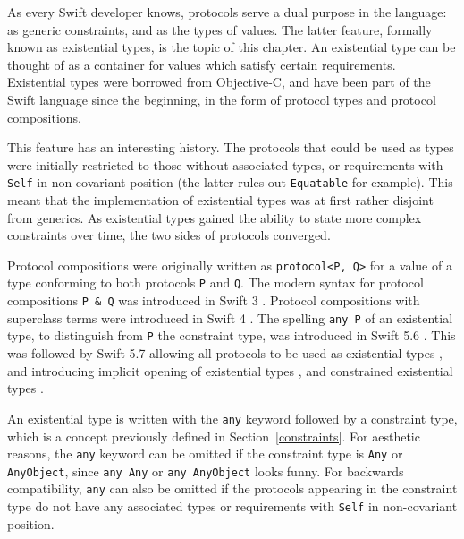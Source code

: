 \documentclass[a4paper,headsepline,bibliography=totoc,toc=flat,fleqn,twoside=semi]{scrbook}
\theoremstyle{definition}
\theoremstyle{definition}
\theoremstyle{definition}
\newcommand{\ifWIP}{\iffalse}
\begin{document}
\ifWIP

As every Swift developer knows, protocols serve a dual purpose in the language: as generic constraints, and as the types of values. The latter feature, formally known as existential types, is the topic of this chapter. An existential type can be thought of as a container for values which satisfy certain requirements. Existential types were borrowed from Objective-C, and have been part of the Swift language since the beginning, in the form of protocol types and protocol compositions. 

This feature has an interesting history. The protocols that could be used as types were initially restricted to those without associated types, or requirements with \texttt{Self} in non-covariant position (the latter rules out \texttt{Equatable} for example). This meant that the implementation of existential types was at first rather disjoint from generics. As existential types gained the ability to state more complex constraints over time, the two sides of protocols converged.

Protocol compositions were originally written as \texttt{protocol<P,~Q>} for a value of a type conforming to both protocols \texttt{P} and \texttt{Q}. The modern syntax for protocol compositions \texttt{P~\&~Q} was introduced in Swift 3 \cite{se0095}. Protocol compositions with superclass terms were introduced in Swift 4 \cite{se0156}. The spelling \texttt{any P} of an existential type, to distinguish from \texttt{P} the constraint type, was introduced in Swift 5.6 \cite{se0355}. This was followed by Swift 5.7 allowing all protocols to be used as existential types \cite{se0309}, and introducing implicit opening of existential types \cite{se0352}, and constrained existential types \cite{se0353}.

An existential type is written with the \texttt{any} keyword followed by a constraint type, which is a concept previously defined in Section~\ref{constraints}. For aesthetic reasons, the \texttt{any} keyword can be omitted if the constraint type is \texttt{Any} or \texttt{AnyObject}, since \texttt{any~Any} or \texttt{any~AnyObject} looks funny. For backwards compatibility, \texttt{any} can also be omitted if the protocols appearing in the constraint type do not have any associated types or requirements with \texttt{Self} in non-covariant position.
\end{document}

